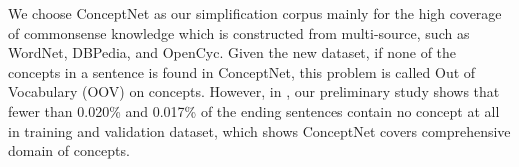 We choose ConceptNet as our simplification corpus mainly for the high coverage of
commonsense knowledge which is constructed from multi-source, such as 
WordNet, DBPedia, and OpenCyc. 
Given the new dataset, if none of the concepts in a sentence 
is found in ConceptNet, this problem is called 
Out of Vocabulary (OOV) on concepts. 
However, in , our preliminary study shows
 that fewer than 0.020\% and 0.017\% of the ending sentences contain no concept at all in training 
 and validation dataset, which shows ConceptNet covers comprehensive domain of concepts.

%
%
%
%
 
